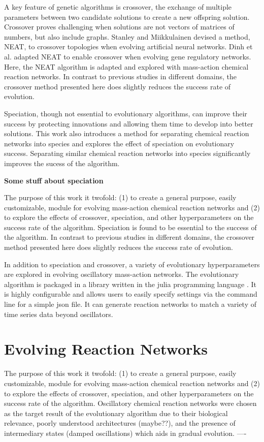 \documentclass[12pt]{report}
\begin{document}
A key feature of genetic algorithms is crossover, the exchange of multiple parameters between two candidate solutions to create a new offspring solution. Crossover proves challenging when solutions are not vectors of matrices of numbers, but also include graphs. Stanley and  Miikkulainen devised a method, NEAT, to crossover topologies when evolving artificial neural networks. Dinh et al. adapted NEAT to enable crossover when evolving gene regulatory networks. Here, the NEAT algorithm is adapted and explored with mass-action chemical reaction networks. In contrast to previous studies in different domains, the crossover method presented here does slightly reduces the success rate of evolution. 

Speciation, though not essential to evolutionary algorithms, can improve their success by protecting innovations and allowing them time to develop into better solutions. This work also introduces a method for separating chemical reaction networks into species and explores the effect of speciation on evolutionary success. Separating similar chemical reaction networks into species significantly improves the sucess of the algorithm.

\textbf{Some stuff about speciation}

The purpose of this work it twofold: (1) to create a general purpose, easily customizable, module for evolving mass-action chemical reaction networks and (2) to explore the effects of crossover, speciation, and other hyperparameters on the success rate of the algorithm. Speciation is found to be essential to the success of the algorithm. In contrast to previous studies in different domains, the crossover method presented here does slightly reduces the success rate of evolution. 


In addition to speciation and crossover, a variety of evolutionary hyperparameters are explored in evolving oscillatory mass-action networks. The evolutionary algorithm is packaged in a library written in the julia programming language \cite{bezanson2017julia}. It is highly configurable and allows users to easily specify settings via the command line for a simple json file. It can generate reaction networks to match a variety of time series data beyond oscillators.




\section{Evolving Reaction Networks}
The purpose of this work it twofold: (1) to create a general purpose, easily customizable, module for evolving mass-action chemical reaction networks and (2) to explore the effects of crossover,  speciation, and other hyperparameters on the success rate of the algorithm. Oscillatory chemical reaction networks were chosen as the target result of the evolutionary algorithm due to their biological relevance, poorly understood architectures (maybe??), and the presence of intermediary states (damped oscillations) which aids in gradual evolution.
----
\end{document}
